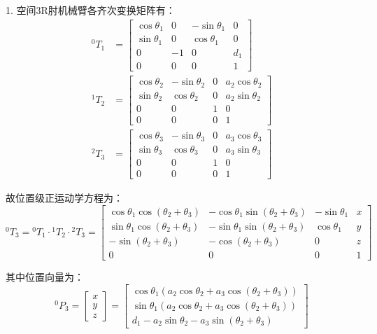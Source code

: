 \documentclass[UTF8,12pt]{ctexart}
\begin{document}
1.
空间3R肘机械臂各齐次变换矩阵有：
\[
\begin{aligned}
    {}^0 T_1 &= \begin{bmatrix}
                    \cos\theta_1 & 0 & -\sin\theta_1 & 0 \\
                    \sin\theta_1 & 0 & \cos\theta_1 & 0 \\
                    0 & -1 & 0 & d_1 \\
                    0 & 0 & 0 & 1
                \end{bmatrix} \\
    {}^1 T_2 &= \begin{bmatrix}
                    \cos\theta_2 & -\sin\theta_2 & 0 & a_2\cos\theta_2 \\
                    \sin\theta_2 & \cos\theta_2 & 0 & a_2\sin\theta_2 \\
                    0 & 0 & 1 & 0 \\
                    0 & 0 & 0 & 1
                \end{bmatrix} \\
    {}^2 T_3 &= \begin{bmatrix}
                    \cos\theta_3 & -\sin\theta_3 & 0 & a_3\cos\theta_3 \\
                    \sin\theta_3 & \cos\theta_3 & 0 & a_3\sin\theta_3 \\
                    0 & 0 & 1 & 0 \\
                    0 & 0 & 0 & 1
                \end{bmatrix}
\end{aligned}
\]

故位置级正运动学方程为：
\[
{}^0 T_3 = {}^0 T_1 \cdot {}^1 T_2 \cdot {}^2 T_3
        = \begin{bmatrix}
            \cos\theta_1 \cos(\theta_2 + \theta_3) & -\cos\theta_1 \sin(\theta_2 + \theta_3) & -\sin\theta_1 & x \\
            \sin\theta_1 \cos(\theta_2 + \theta_3) & -\sin\theta_1 \sin(\theta_2 + \theta_3) & \cos\theta_1 & y \\
            -\sin(\theta_2 + \theta_3) & -\cos(\theta_2 + \theta_3) & 0 & z \\
            0 & 0 & 0 & 1
        \end{bmatrix}
\]

其中位置向量为：
\[
    {}^0 P_3 = \begin{bmatrix}
                    x \\
                    y \\
                    z
                \end{bmatrix}
            = \begin{bmatrix}
                \cos\theta_1 (a_2 \cos\theta_2 + a_3 \cos(\theta_2 + \theta_3)) \\
                \sin\theta_1 (a_2 \cos\theta_2 + a_3 \cos(\theta_2 + \theta_3)) \\
                d_1 - a_2 \sin\theta_2 - a_3 \sin(\theta_2 + \theta_3)
            \end{bmatrix}
\]
\end{document}
